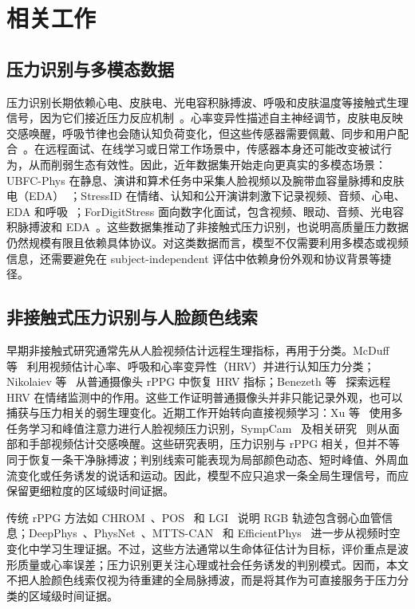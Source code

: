 \documentclass[runningheads]{llncs}
\begin{document}
\section{相关工作}

\subsection{压力识别与多模态数据}

压力识别长期依赖心电、皮肤电、光电容积脉搏波、呼吸和皮肤温度等接触式生理信号，因为它们接近压力反应机制~\cite{healey2005drivingstress,schmidt2018wesad,schmidt2019wearableaffectreview}。心率变异性描述自主神经调节，皮肤电反映交感唤醒，呼吸节律也会随认知负荷变化，但这些传感器需要佩戴、同步和用户配合~\cite{schmidt2018wesad,bota2022empathicschool}。在远程面试、在线学习或日常工作场景中，传感器本身还可能改变被试行为，从而削弱生态有效性。因此，近年数据集开始走向更真实的多模态场景：UBFC-Phys 在静息、演讲和算术任务中采集人脸视频以及腕带血容量脉搏和皮肤电（EDA）~\cite{sabour2021ubfcphys}；StressID 在情绪、认知和公开演讲刺激下记录视频、音频、心电、EDA 和呼吸~\cite{chaptoukaev2023stressid}；ForDigitStress 面向数字化面试，包含视频、眼动、音频、光电容积脉搏波和 EDA~\cite{heimerl2024fordigitstress}。这些数据集推动了非接触式压力识别，也说明高质量压力数据仍然规模有限且依赖具体协议。对这类数据而言，模型不仅需要利用多模态或视频信息，还需要避免在 subject-independent 评估中依赖身份外观和协议背景等捷径。

\subsection{非接触式压力识别与人脸颜色线索}

早期非接触式研究通常先从人脸视频估计远程生理指标，再用于分类。McDuff 等~\cite{mcduff2014remote} 利用视频估计心率、呼吸和心率变异性（HRV）并进行认知压力分类；Nikolaiev 等~\cite{nikolaiev2020noncontact} 从普通摄像头 rPPG 中恢复 HRV 指标；Benezeth 等~\cite{benezeth2018remotehrv} 探索远程 HRV 在情绪监测中的作用。这些工作证明普通摄像头并非只能记录外观，也可以捕获与压力相关的弱生理变化。近期工作开始转向直接视频学习：Xu 等~\cite{xu2024mtasr} 使用多任务学习和峰值注意力进行人脸视频压力识别，SympCam~\cite{braun2024sympcam} 及相关研究~\cite{braun2023sympathetic} 则从面部和手部视频估计交感唤醒。这些研究表明，压力识别与 rPPG 相关，但并不等同于恢复一条干净脉搏波；判别线索可能表现为局部颜色动态、短时峰值、外周血流变化或任务诱发的说话和运动。因此，模型不应只追求一条全局生理信号，而应保留更细粒度的区域级时间证据。

传统 rPPG 方法如 CHROM~\cite{dehaan2013chrom}、POS~\cite{wang2017pos} 和 LGI~\cite{pilz2018lgi} 说明 RGB 轨迹包含弱心血管信息；DeepPhys~\cite{chen2018deepphys}、PhysNet~\cite{yu2019physnet}、MTTS-CAN~\cite{liu2020mttscan} 和 EfficientPhys~\cite{liu2023efficientphys} 进一步从视频时空变化中学习生理证据。不过，这些方法通常以生命体征估计为目标，评价重点是波形质量或心率误差；压力识别更关注心理或社会任务诱发的判别模式。因而，本文不把人脸颜色线索仅视为待重建的全局脉搏波，而是将其作为可直接服务于压力分类的区域级时间证据。
\end{document}
